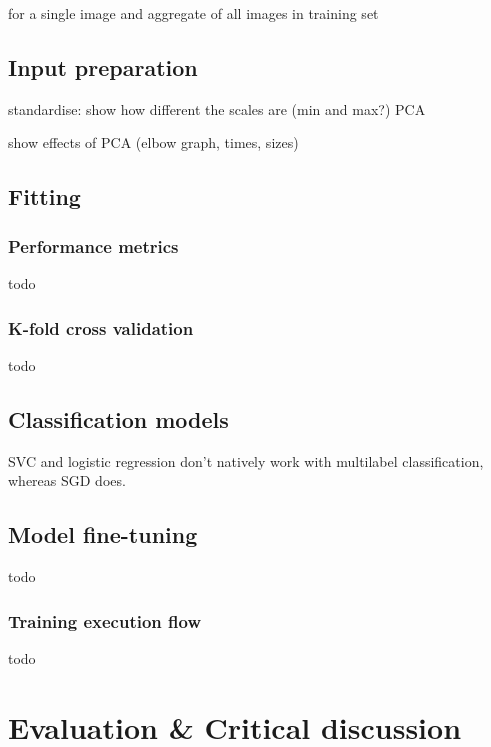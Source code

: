 \documentclass[letterpaper,12pt]{article}
\begin{document}
for a single image and aggregate of all images in training set

\subsection{Input preparation}

standardise: show how different the  scales are (min  and max?)
PCA

show effects of PCA (elbow graph, times, sizes)

\subsection{Fitting}

\subsubsection{Performance metrics}

todo

\subsubsection{K-fold cross validation}

todo

\subsection{Classification models}

SVC and logistic regression  don't natively work with multilabel classification, whereas SGD does.

\subsection{Model fine-tuning}

todo

\subsubsection{Training  execution flow}

todo


\section{Evaluation \& Critical discussion}
\label{sec:evaluation}
\end{document}
